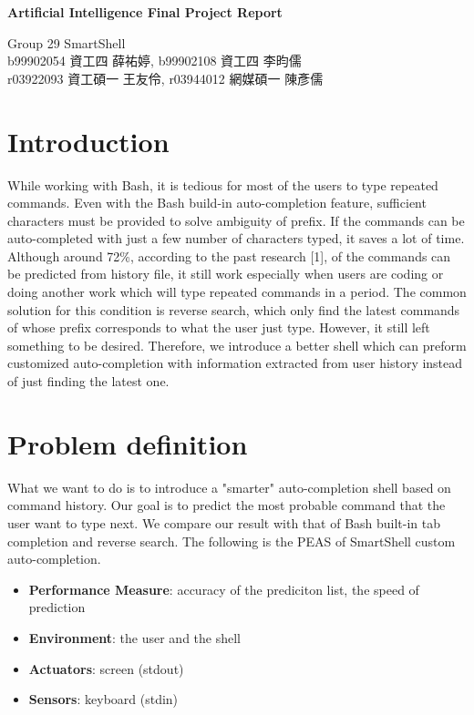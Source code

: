 \documentclass[11pt,a4paper]{article}
\begin{document}

\begin{center}
\textbf{\Large Artificial Intelligence Final Project Report}\\[1em]
\begin{CJK}{UTF8}{bsmi}
{\Large Group 29 SmartShell}\\[1em]
{\large b99902054 資工四 薛祐婷, }
{\large b99902108 資工四 李昀儒 }\\[1em]
{\large r03922093 資工碩一 王友伶, }
{\large r03944012 網媒碩一 陳彥儒 }\\[1em]
\end{CJK}
\end{center}
\section*{Introduction}
While working with Bash, it is tedious for most of the users to type repeated commands. 
Even with the Bash build-in auto-completion feature, sufficient characters must be provided to solve ambiguity of prefix.
If the commands can be auto-completed with just a few number of characters typed, it saves a lot of time. 
Although around 72\%, according to the past research [1], of the commands can be predicted from history file, 
it still work especially when users are coding or doing another work which will type repeated commands in a period. 
The common solution for this condition is reverse search, 
which only find the latest commands of whose prefix corresponds to what the user just type. 
However, it still left something to be desired. 
Therefore, we introduce a better shell which can preform customized auto-completion with information extracted from user history instead of just finding the latest one.

\section*{Problem definition}
What we want to do is to introduce a "smarter" auto-completion shell based on command history.
Our goal is to predict the most probable command that the user want to type next. 
We compare our result with that of Bash built-in tab completion and reverse search. 
The following is the PEAS of SmartShell custom auto-completion.

\begin{itemize}
\item {\bf Performance Measure}: accuracy of the prediciton list, the speed of prediction
\item {\bf Environment}: the user and the shell
\item {\bf Actuators}: screen (stdout)
\item {\bf Sensors}: keyboard (stdin)
\end{itemize}
\end{document}
